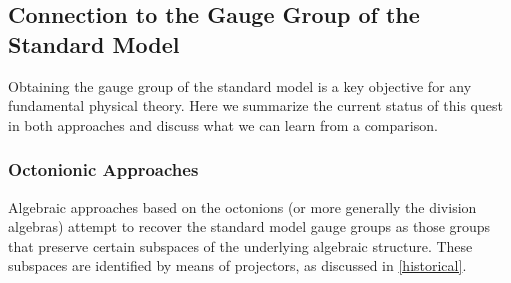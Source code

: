 \documentclass[reqno,11pt]{amsart}
\numberwithin{equation}{section}
\newcommand{\1}{\mbox{\rm 1 \hspace{-1.05 em} 1}}
\renewcommand{\L}{{\mathcal{L}}}
\newcommand\Felix[1]{}
\begin{document}
%
%


\subsection{Connection to the Gauge Group of the Standard Model}\label{sec:gaugegroup}
Obtaining the gauge group of the standard model is a key objective for any fundamental physical theory. Here we summarize the current status of this quest in both approaches and discuss
what we can learn from a comparison. 

\subsubsection{Octonionic Approaches} 
Algebraic approaches based on the octonions (or more generally the division algebras) attempt to recover the standard model gauge groups as those groups that preserve certain subspaces of the underlying algebraic structure. These subspaces are identified by means of projectors, as discussed in \ref{historical}.
\end{document}
